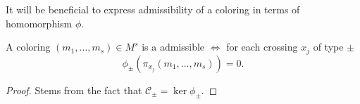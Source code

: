 
It will be beneficial to express admissibility of a coloring in terms of homomorphism $\phi$.
\begin{proposition}
  A coloring $(m_1,..., m_s)\in M^s$ is a admissible $\iff$ for each crossing $x_j$ of type $\pm$ 
  $$\phi_\pm(\pi_{x_j}(m_1,...,m_s))=0.$$
\end{proposition}

\begin{proof}
  Stems from the fact that $\mathcal{C}_\pm=\ker\phi_\pm$.
\end{proof}

